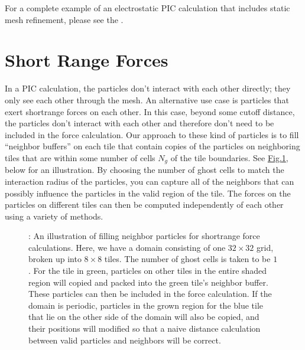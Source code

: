 \documentclass[letterpaper,10pt,english]{sphinxmanual}
\begin{document}
\sphinxAtStartPar
For a complete example of an electrostatic PIC calculation that includes static
mesh refinement, please see the .


\section{Short Range Forces}
\label{\detokenize{Particle:short-range-forces}}\label{\detokenize{Particle:sec-particles-shortrange}}
\sphinxAtStartPar
In a PIC calculation, the particles don’t interact with each other directly;
they only see each other through the mesh. An alternative use case is particles
that exert short\sphinxhyphen{}range forces on each other. In this case, beyond some cut\sphinxhyphen{}off
distance, the particles don’t interact with each other and therefore don’t need
to be included in the force calculation. Our approach to these kind of
particles is to fill “neighbor buffers” on each tile that contain copies of the
particles on neighboring tiles that are within some number of cells \(N_g\)
of the tile boundaries. See \hyperref[\detokenize{Particle:fig-particles-neighbor-particles}]{Fig.\@ \ref{\detokenize{Particle:fig-particles-neighbor-particles}}}, below
for an illustration. By choosing the number of ghost cells to match the
interaction radius of the particles, you can capture all of the neighbors that
can possibly influence the particles in the valid region of the tile. The
forces on the particles on different tiles can then be computed independently
of each other using a variety of methods.

\begin{center}

\begin{figure}[htbp]
\centering
\capstart

\noindent{}
\caption{: An illustration of filling neighbor particles for short\sphinxhyphen{}range force
calculations. Here, we have a domain consisting of one \(32 \times 32\)
grid, broken up into \(8 \times 8\) tiles. The number of ghost cells is
taken to be \(1\).  For the tile in green, particles on other tiles in
the entire shaded region will copied and packed into the green tile’s
neighbor buffer. These particles can then be included in the force
calculation. If the domain is periodic, particles in the grown region for
the blue tile that lie on the other side of the domain will also be copied,
and their positions will modified so that a naive distance calculation
between valid particles and neighbors will be correct.}\label{\detokenize{Particle:id8}}\label{\detokenize{Particle:fig-particles-neighbor-particles}}\end{figure}

\end{center}
\end{document}
